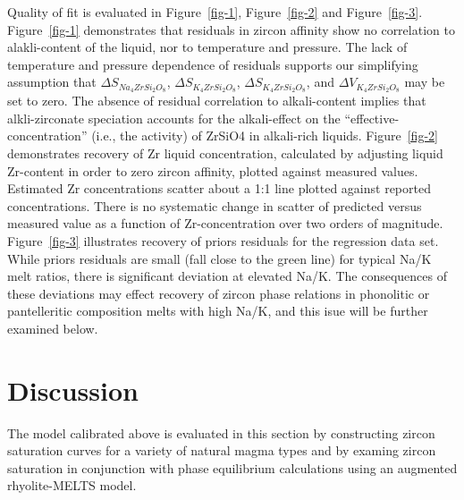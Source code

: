 \documentclass[
]{agujournal2019}
\begin{document}
Quality of fit is evaluated in Figure~\ref{fig-1}, Figure~\ref{fig-2}
and Figure~\ref{fig-3}. Figure~\ref{fig-1} demonstrates that residuals
in zircon affinity show no correlation to alakli-content of the liquid,
nor to temperature and pressure. The lack of temperature and pressure
dependence of residuals supports our simplifying assumption that
\(\Delta S_{Na_4ZrSi_2O_8}\), \(\Delta S_{K_4ZrSi_2O_8}\),
\(\Delta S_{K_4ZrSi_2O_8}\), and \(\Delta V_{K_4ZrSi_2O_8}\) may be set
to zero. The absence of residual correlation to alkali-content implies
that alkli-zirconate speciation accounts for the alkali-effect on the
``effective-concentration'' (i.e., the activity) of ZrSiO4 in
alkali-rich liquids. Figure~\ref{fig-2} demonstrates recovery of Zr
liquid concentration, calculated by adjusting liquid Zr-content in order
to zero zircon affinity, plotted against measured values. Estimated Zr
concentrations scatter about a 1:1 line plotted against reported
concentrations. There is no systematic change in scatter of predicted
versus measured value as a function of Zr-concentration over two orders
of magnitude. Figure~\ref{fig-3} illustrates recovery of priors
residuals for the regression data set. While priors residuals are small
(fall close to the green line) for typical Na/K melt ratios, there is
significant deviation at elevated Na/K. The consequences of these
deviations may effect recovery of zircon phase relations in phonolitic
or pantelleritic composition melts with high Na/K, and this isue will be
further examined below.

\section{Discussion}\label{discussion}

The model calibrated above is evaluated in this section by constructing
zircon saturation curves for a variety of natural magma types and by
examing zircon saturation in conjunction with phase equilibrium
calculations using an augmented rhyolite-MELTS model.
\end{document}
